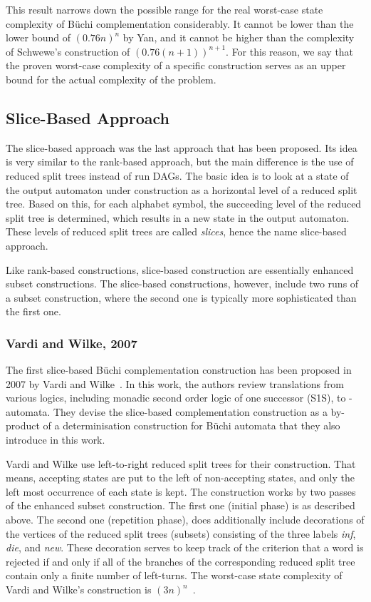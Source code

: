 This result narrows down the possible range for the real worst-case state complexity of Büchi complementation considerably. It cannot be lower than the lower bound of $(0.76n)^n$ by Yan, and it cannot be higher than the complexity of Schwewe's construction of $\left(0.76\left(n+1\right)\right)^{n+1}$. For this reason, we say that the proven worst-case complexity of a specific construction serves as an upper bound for the actual complexity of the problem.


\subsection{Slice-Based Approach}
\label{2_slice-based}
The slice-based approach was the last approach that has been proposed. Its idea is very similar to the rank-based approach, but the main difference is the use of reduced split trees instead of run DAGs. The basic idea is to look at a state of the output automaton under construction as a horizontal level of a reduced split tree. Based on this, for each alphabet symbol, the succeeding level of the reduced split tree is determined, which results in a new state in the output automaton. These levels of reduced split trees are called \textit{slices}, hence the name slice-based approach.

Like rank-based constructions, slice-based construction are essentially enhanced subset constructions. The slice-based constructions, however, include two runs of a subset construction, where the second one is typically more sophisticated than the first one.


\subsubsection{Vardi and Wilke, 2007}
The first slice-based Büchi complementation construction has been proposed in 2007 by Vardi and Wilke~\cite{vardi2007automata}. In this work, the authors review translations from various logics, including monadic second order logic of one successor (S1S), to \om-automata. They devise the slice-based complementation construction as a by-product of a determinisation construction for Büchi automata that they also introduce in this work.

Vardi and Wilke use left-to-right reduced split trees for their construction. That means, accepting states are put to the left of non-accepting states, and only the left most occurrence of each state is kept. The construction works by two passes of the enhanced subset construction. The first one (initial phase) is as described above. The second one (repetition phase), does additionally include decorations of the vertices of the reduced split trees (subsets) consisting of the three labels \textit{inf}, \textit{die}, and \textit{new}. These decoration serves to keep track of the criterion that a word is rejected if and only if all of the branches of the corresponding reduced split tree contain only a finite number of left-turns. The worst-case state complexity of Vardi and Wilke's construction is $(3n)^n$~\cite{vardi2007automata}.

